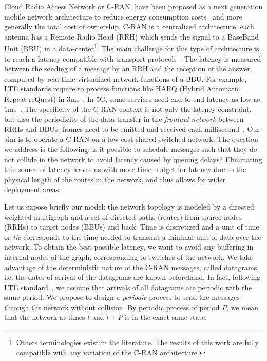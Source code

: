 \documentclass[a4paper,10pt]{article}
\begin{document}
Cloud Radio Access Network or C-RAN, have been proposed as a next generation mobile network architecture to reduce energy consumption costs~\cite{mobile2011c} and more generally the total cost of ownership.
C-RAN is a centralized architecture, each antenna has a Remote Radio Head (RRH) which sends the signal to
a BaseBand Unit (BBU) in a data-center\footnote{Others terminologies exist in the literature. The results of this work are fully compatible with any variation of the C-RAN architecture.}.
The main challenge for this type of architecture is to reach a latency compatible with transport protocols~\cite{ieeep802}. The latency is measured between the sending of a message by an RRH and the reception of the answer, computed by real-time virtualized network functions of a BBU. For example, LTE standards require to process functions like HARQ (Hybrid Automatic Repeat reQuest) in $3$ms~\cite{bouguen2012lte}. In 5G, some services need end-to-end latency as low as $1$ms~\cite{3gpp5g,boccardi2014five}. The specificity of the C-RAN context is not only the latency constraint, but also the periodicity of the data transfer in the \emph{frontaul network} between RRHs and BBUs: frames need to be emitted and received each millisecond~\cite{bouguen2012lte}.
Our aim is to operate a C-RAN on a low-cost shared switched network.
The question we address is the following: is it possible to schedule messages such that they do not collide in the network to avoid latency caused by queuing delays? Eliminating this source of latency leaves us with more time budget for latency due to the physical length of the routes in the network, and thus allows for wider deployment areas.

Let us expose briefly our model: the network topology is modeled by a directed weighted multigraph and a set of directed paths (routes) from source nodes (RRHs) to target nodes (BBUs) and back. Time is discretized and a unit of time or \emph{tic} corresponds to the time needed to transmit a minimal unit of data over the network. To obtain the best possible latency, we want to avoid any buffering in internal nodes of the graph, corresponding to switches of the network. We take advantage of the deterministic nature of the C-RAN messages, called datagrams, i.e. the dates of arrival of the datagrams are known beforehand. In fact, following LTE standard~\cite{bouguen2012lte}, we assume that arrivals of all datagrams are periodic with the same period. We propose to design a \emph{periodic} process to send the messages through the network without collision. By periodic process of period $P$, we mean that the network at times $t$ and $t+P$ is in the exact same state. 
\end{document}
